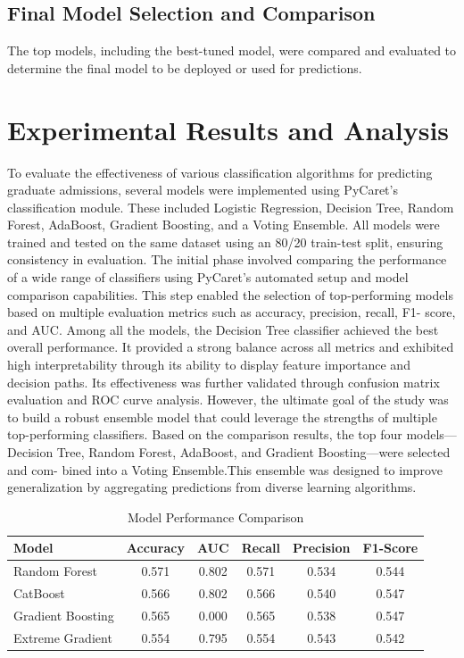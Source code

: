 \documentclass[journal]{IEEEtran}
\begin{document}
\subsection{Final Model Selection and Comparison}
The top models, including the best-tuned model, were compared and evaluated to determine the final model to be deployed or used for predictions.

\section{Experimental Results and Analysis}
To evaluate the effectiveness of various classification
algorithms for predicting graduate admissions, several models
were implemented using PyCaret’s classification module.
These included Logistic Regression, Decision Tree, Random
Forest, AdaBoost, Gradient Boosting, and a Voting Ensemble.
All models were trained and tested on the same dataset using
an 80/20 train-test split, ensuring consistency in evaluation.
The initial phase involved comparing the performance
of a wide range of classifiers using PyCaret’s automated
setup and model comparison capabilities. This step enabled
the selection of top-performing models based on multiple
evaluation metrics such as accuracy, precision, recall, F1-
score, and AUC.
Among all the models, the Decision Tree classifier
achieved the best overall performance. It provided a strong
balance across all metrics and exhibited high interpretability
through its ability to display feature importance and decision
paths. Its effectiveness was further validated through confusion
matrix evaluation and ROC curve analysis.
However, the ultimate goal of the study was to build a
robust ensemble model that could leverage the strengths of
multiple top-performing classifiers. Based on the comparison
results, the top four models—Decision Tree, Random Forest,
AdaBoost, and Gradient Boosting—were selected and com-
bined into a Voting Ensemble.This ensemble was designed
to improve generalization by aggregating predictions from
diverse learning algorithms.

\begin{table}[H]
\centering
\caption{Model Performance Comparison}
\begin{tabular}{|l|c|c|c|c|c|}
\hline
\textbf{Model} & \textbf{Accuracy} & \textbf{AUC} & \textbf{Recall} & \textbf{Precision} & \textbf{F1-Score} \\
\hline
Random Forest        & 0.571 & 0.802 & 0.571 & 0.534 & 0.544 \\
CatBoost             & 0.566 & 0.802 & 0.566 & 0.540 & 0.547 \\
Gradient Boosting    & 0.565 & 0.000 & 0.565 & 0.538 & 0.547 \\
Extreme Gradient     & 0.554 & 0.795 & 0.554 & 0.543 & 0.542 \\
\hline
\end{tabular}
\label{table:results}
\end{table}
\end{document}
